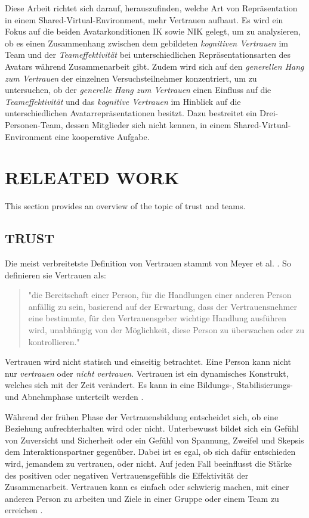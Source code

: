 \documentclass[sigchi]{acmart}
\begin{document}
Diese Arbeit richtet sich darauf, herauszufinden, welche Art von Repräsentation in einem Shared-Virtual-Environment, mehr Vertrauen aufbaut. Es wird ein Fokus auf die beiden Avatarkonditionen IK sowie NIK gelegt, um zu analysieren, ob es einen Zusammenhang zwischen dem gebildeten \textit{kognitiven Vertrauen} im Team und der \textit{Teameffektivität} bei unterschiedlichen Repräsentationsarten des Avatars während Zusammenarbeit gibt.
Zudem wird sich auf den \textit{generellen Hang zum Vertrauen} der einzelnen Versuchsteilnehmer konzentriert, um zu untersuchen, ob der \textit{generelle Hang zum Vertrauen} einen Einfluss auf die \textit{Teameffektivität} und das \textit{kognitive Vertrauen} im Hinblick auf die unterschiedlichen Avatarrepräsentationen besitzt. Dazu bestreitet ein Drei-Personen-Team, dessen Mitglieder sich nicht kennen, in einem Shared-Virtual-Environment eine kooperative Aufgabe.

\section{RELEATED WORK}
This section provides an overview of the topic of trust and teams.
\subsection{TRUST}
Die meist verbreitetste Definition von Vertrauen stammt von Meyer et al. \citep[S. 712]{mayer1995integrative}. So definieren sie Vertrauen als:
\begin{quote} "die Bereitschaft einer Person, für die Handlungen einer anderen Person anfällig zu sein, basierend auf der Erwartung, dass der Vertrauensnehmer eine bestimmte, für den Vertrauensgeber wichtige Handlung ausführen wird, unabhängig von der Möglichkeit, diese Person zu überwachen oder zu kontrollieren." \end{quote}

Vertrauen wird nicht statisch und einseitig betrachtet. Eine Person kann nicht nur \textit{vertrauen} oder \textit{nicht vertrauen}. Vertrauen ist ein dynamisches Konstrukt, welches sich mit der Zeit verändert. Es kann in eine Bildungs-, Stabilisierungs- und Abnehmphase unterteilt werden \citep[S. 396]{rousseau1998not}.

Während der frühen Phase der Vertrauensbildung entscheidet sich, ob eine Beziehung aufrechterhalten wird oder nicht. Unterbewusst bildet sich ein Gefühl von Zuversicht und Sicherheit oder ein Gefühl von Spannung, Zweifel und Skepsis dem Interaktionspartner gegenüber. 
Dabei ist es egal, ob sich dafür entschieden wird, jemandem zu vertrauen, oder nicht. Auf jeden Fall beeinflusst die Stärke des positiven oder negativen Vertrauensgefühls die Effektivität der Zusammenarbeit. Vertrauen kann es einfach oder schwierig machen, mit einer anderen Person zu arbeiten und Ziele in einer Gruppe oder einem Team zu erreichen \citep[S. 405-406]{bigley1998straining}.
\end{document}
